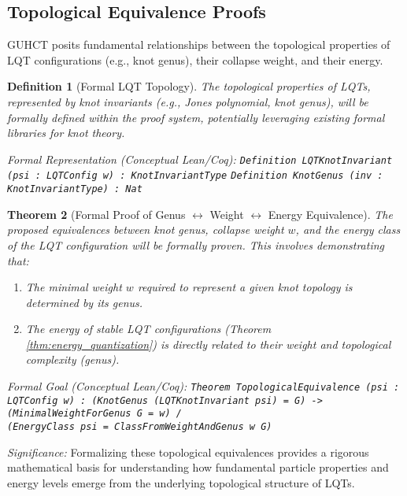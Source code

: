 \documentclass[11pt,a4paper]{article}
\newtheorem{theorem}{Theorem}[section]
\newtheorem{definition}[theorem]{Definition}
\begin{document}
\subsection{Topological Equivalence Proofs}
\label{subsec:topological_equivalence_formalization}

GUHCT posits fundamental relationships between the topological properties of LQT configurations (e.g., knot genus), their collapse weight, and their energy.

\begin{definition}[Formal LQT Topology]
The topological properties of LQTs, represented by knot invariants (e.g., Jones polynomial, knot genus), will be formally defined within the proof system, potentially leveraging existing formal libraries for knot theory.

Formal Representation (Conceptual Lean/Coq):
\texttt{Definition LQTKnotInvariant (psi : LQTConfig w) : KnotInvariantType}
\texttt{Definition KnotGenus (inv : KnotInvariantType) : Nat}
\end{definition}

\begin{theorem}[Formal Proof of Genus $\leftrightarrow$ Weight $\leftrightarrow$ Energy Equivalence]
The proposed equivalences between knot genus, collapse weight $w$, and the energy class of the LQT configuration will be formally proven. This involves demonstrating that:
\begin{enumerate}
    \item The minimal weight $w$ required to represent a given knot topology is determined by its genus.
    \item The energy of stable LQT configurations (Theorem \ref{thm:energy_quantization}) is directly related to their weight and topological complexity (genus).
\end{enumerate}

Formal Goal (Conceptual Lean/Coq):
\texttt{Theorem TopologicalEquivalence (psi : LQTConfig w) :
  (KnotGenus (LQTKnotInvariant psi) = G) ->
  (MinimalWeightForGenus G = w)  /\ \\
  (EnergyClass psi = ClassFromWeightAndGenus w G)}
\end{theorem}

\textit{Significance:} Formalizing these topological equivalences provides a rigorous mathematical basis for understanding how fundamental particle properties and energy levels emerge from the underlying topological structure of LQTs.
\end{document}
